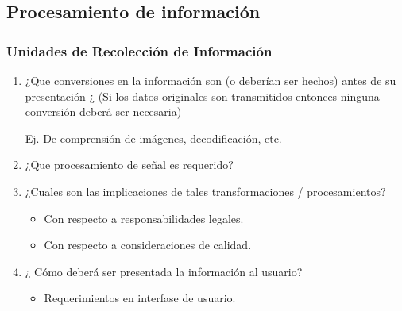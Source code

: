 \subsection{Procesamiento de información}

\subsubsection{Unidades de Recolección de Información}

\begin{enumerate}
\item ¿Que conversiones en la información son (o deberían ser hechos) antes de su presentación ¿ (Si los datos originales son transmitidos entonces ninguna conversión deberá ser necesaria)

Ej. De-comprensión  de imágenes, decodificación, etc.

\item ¿Que procesamiento de señal es requerido?
\item ¿Cuales son las implicaciones de tales transformaciones / procesamientos?
\begin{itemize}
\item Con respecto a responsabilidades legales. 
\item Con respecto a consideraciones de calidad.
\end{itemize}

\item ¿ Cómo deberá ser presentada la información al usuario? 
\begin{itemize}
\item Requerimientos en interfase de usuario.\end{itemize}
\end{enumerate}
